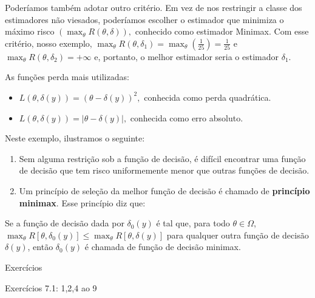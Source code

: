 \documentclass[12pt]{beamer}
\begin{document}
\begin{frame}{}
\begin{block}{}
\justifying
Poderíamos também adotar outro critério. Em vez de nos restringir a classe dos estimadores não viesados, poderíamos escolher o estimador que minimiza o máximo risco $(\max_\theta R(\theta, \delta)),$ conhecido como estimador Minimax. Com esse critério, nosso exemplo, $\max_\theta R(\theta, \delta_1) = \max_\theta \left(\frac{1}{25}\right) = \frac{1}{25}$ e $\max_\theta R(\theta, \delta_2) = +\infty$ e, portanto, o melhor estimador seria o estimador $\delta_{1}.$
\end{block}
\pause
\begin{block}{As funções perda mais utilizadas:}
\justifying
\begin{itemize}
    \item $L(\theta, \delta(y))=(\theta-\delta(y))^{2},$ conhecida como perda quadrática.
    \item $L(\theta, \delta(y))=|\theta-\delta(y)|,$ conhecida como erro absoluto.
\end{itemize}
\end{block}
\end{frame}

\begin{frame}{}
\begin{block}{Neste exemplo, ilustramos o seguinte:}
\justifying
\begin{enumerate}
    \item Sem alguma restrição sob a função de decisão, é difícil encontrar uma função de decisão que tem risco uniformemente menor que outras funções de decisão.\pause
    \item Um princípio de seleção da melhor função de decisão é chamado de \textbf{princípio minimax}. Esse princípio diz que: 
\end{enumerate}
\end{block}

\begin{block}{}
\justifying
Se a função de decisão dada por $\delta_{0}(y)$ é tal que, para todo $\theta \in \Omega$,
$\max_\theta R[\theta, \delta_0(y)] \leq \max_\theta R[\theta, \delta(y)]$
para qualquer outra função de decisão $\delta(y)$, então $\delta_0(y)$ é chamada de função de decisão minimax.
\end{block}
\end{frame}

\begin{frame}{Exercícios}
\begin{block}{\Home}
\justifying
Exercícios 7.1: 1,2,4 ao 9
\end{block}
\end{frame}
\end{document}
